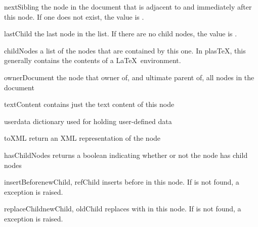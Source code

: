 \documentclass{manual}
\newcommand{\plasTeX}{plas\TeX}
\begin{document}
\begin{memberdesc}[Node]{nextSibling}
the node in the document that is adjacent to and immediately after this 
node.  If one does not exist, the value is .
\end{memberdesc}

\begin{memberdesc}[Node]{lastChild}
the last node in the  list.  If there are no child nodes,
the value is .
\end{memberdesc}

\begin{memberdesc}[Node]{childNodes}
a list of the nodes that are contained by this one.  In \plasTeX, this 
generally contains the contents of a \LaTeX\ environment.
\end{memberdesc}

\begin{memberdesc}[Node]{ownerDocument}
the node that owner of, and ultimate parent of, all nodes in the document
\end{memberdesc}

\begin{memberdesc}[Node]{textContent}
contains just the text content of this node
\end{memberdesc}

\begin{memberdesc}[Node]{userdata}
dictionary used for holding user-defined data
\end{memberdesc}

\begin{methoddesc}[Node]{toXML}{}
return an XML representation of the node
\end{methoddesc}

\begin{methoddesc}[Node]{hasChildNodes}{}
returns a boolean indicating whether or not the node has child nodes
\end{methoddesc}

\begin{methoddesc}[Node]{insertBefore}{newChild, refChild}
inserts  before  in this node.  If 
is not found, a  exception is raised.
\end{methoddesc}

\begin{methoddesc}[Node]{replaceChild}{newChild, oldChild}
replaces  with  in this node.  If 
is not found, a  exception is raised.
\end{methoddesc}
\end{document}
